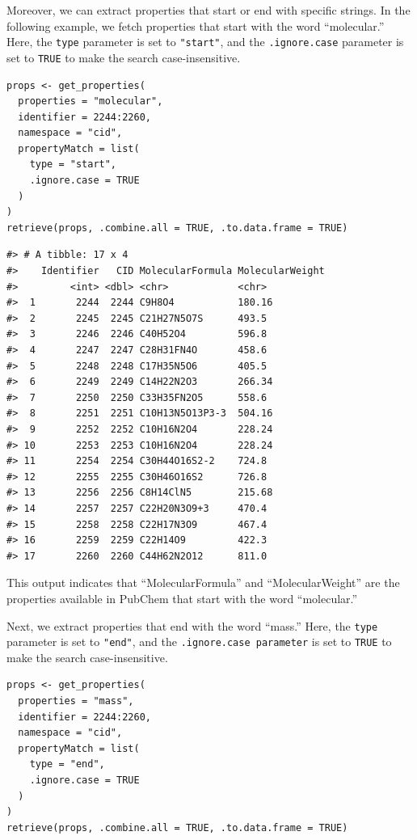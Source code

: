 Moreover, we can extract properties that start or end with specific strings. In the following example, we fetch properties that start with the word ``molecular.'' Here, the \texttt{type} parameter is set to \texttt{"start"}, and the \texttt{.ignore.case} parameter is set to \texttt{TRUE} to make the search case-insensitive.

\begin{verbatim}
props <- get_properties(
  properties = "molecular",
  identifier = 2244:2260,
  namespace = "cid",
  propertyMatch = list(
    type = "start",
    .ignore.case = TRUE
  )
)
retrieve(props, .combine.all = TRUE, .to.data.frame = TRUE)
\end{verbatim}

\begin{verbatim}
#> # A tibble: 17 x 4
#>    Identifier   CID MolecularFormula MolecularWeight
#>         <int> <dbl> <chr>            <chr>          
#>  1       2244  2244 C9H8O4           180.16         
#>  2       2245  2245 C21H27N5O7S      493.5          
#>  3       2246  2246 C40H52O4         596.8          
#>  4       2247  2247 C28H31FN4O       458.6          
#>  5       2248  2248 C17H35N5O6       405.5          
#>  6       2249  2249 C14H22N2O3       266.34         
#>  7       2250  2250 C33H35FN2O5      558.6          
#>  8       2251  2251 C10H13N5O13P3-3  504.16         
#>  9       2252  2252 C10H16N2O4       228.24         
#> 10       2253  2253 C10H16N2O4       228.24         
#> 11       2254  2254 C30H44O16S2-2    724.8          
#> 12       2255  2255 C30H46O16S2      726.8          
#> 13       2256  2256 C8H14ClN5        215.68         
#> 14       2257  2257 C22H20N3O9+3     470.4          
#> 15       2258  2258 C22H17N3O9       467.4          
#> 16       2259  2259 C22H14O9         422.3          
#> 17       2260  2260 C44H62N2O12      811.0
\end{verbatim}

This output indicates that ``MolecularFormula'' and ``MolecularWeight'' are the properties available in PubChem that start with the word ``molecular.''

Next, we extract properties that end with the word ``mass.'' Here, the \texttt{type} parameter is set to \texttt{"end"}, and the \texttt{.ignore.case\ parameter} is set to \texttt{TRUE} to make the search case-insensitive.

\begin{verbatim}
props <- get_properties(
  properties = "mass",
  identifier = 2244:2260,
  namespace = "cid",
  propertyMatch = list(
    type = "end",
    .ignore.case = TRUE
  )
)
retrieve(props, .combine.all = TRUE, .to.data.frame = TRUE)
\end{verbatim}

